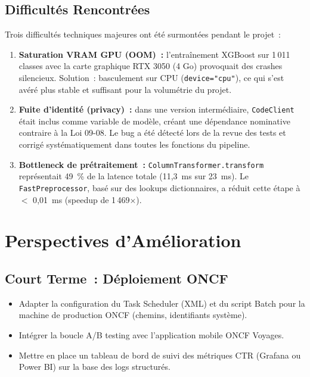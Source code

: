 \documentclass[12pt, a4paper]{report}
\begin{document}
\subsection{Difficultés Rencontrées}

Trois difficultés techniques majeures ont été surmontées pendant le projet~:

\begin{enumerate}
\item \textbf{Saturation VRAM GPU (OOM)~:} l'entraînement XGBoost sur 1\,011
    classes avec la carte graphique RTX 3050 (4 Go) provoquait des crashes
    silencieux. Solution~: basculement sur CPU (\texttt{device="cpu"}), ce
    qui s'est avéré plus stable et suffisant pour la volumétrie du projet.

\item \textbf{Fuite d'identité (privacy)~:} dans une version intermédiaire,
    \texttt{CodeClient} était inclus comme variable de modèle, créant une
    dépendance nominative contraire à la Loi 09-08. Le bug a été détecté lors
    de la revue des tests et corrigé systématiquement dans toutes les fonctions
    du pipeline.

\item \textbf{Bottleneck de prétraitement~:} \texttt{ColumnTransformer.transform}
    représentait 49~\% de la latence totale (11{,}3~ms sur 23~ms). Le
    \texttt{FastPreprocessor}, basé sur des lookups dictionnaires, a réduit
    cette étape à $<$ 0{,}01~ms (speedup de 1\,469×).
\end{enumerate}

\section{Perspectives d'Amélioration}

\subsection{Court Terme~: Déploiement ONCF}

\begin{itemize}
\item Adapter la configuration du Task Scheduler (XML) et du script Batch
    pour la machine de production ONCF (chemins, identifiants système).
\item Intégrer la boucle A/B testing avec l'application mobile ONCF Voyages.
\item Mettre en place un tableau de bord de suivi des métriques CTR (Grafana
    ou Power BI) sur la base des logs structurés.
\end{itemize}
\end{document}
